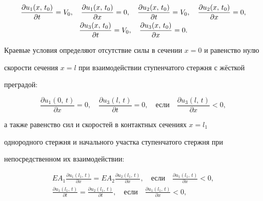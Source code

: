 \begin{gather}

\label{bit10:2}\notag

\frac{\partial u_1 (x,\,t_0)}{\partial t}=V_0,

\quad

\frac{\partial u_1 (x,\,t_0)}{\partial x}=0,

\quad

\frac{\partial u_2 (x,\,t_0 )}{\partial t}=V_0,

\quad

\frac{\partial u_2 (x,\,t_0 )}{\partial x}=0,\\

\frac{\partial u_3 (x,\,t_0 )}{\partial t}=V_0,

\quad

\frac{\partial u_3 (x,\,t_0)}{\partial x}=0.

\end{gather}



Краевые условия определяют отсутствие силы в сечении $x =0$ и равенство нулю

скорости сечения $x = l$ при взаимодействии ступенчатого стержня с жёсткой

преградой:

\begin{equation}

\label{bit10:3}

\frac{\partial u_1 (0,\,t)}{\partial x}=0,

\quad

\frac{\partial u_3 (l,\,t)}{\partial t}=0, \quad \text{если} \quad \frac{\partial u_3

(l,\,t)}{\partial x}<0,

\end{equation}

а также равенство сил и скоростей в контактных сечениях \mbox{$x = l_1$}

однородного стержня и начального участка ступенчатого стержня при

непосредственном их взаимодействии:

\begin{gather}

\label{bit10:4}

EA_1 \frac{\partial u_1 (l_1,\,t)}{\partial x}=EA_2 \frac{\partial u_2 (l_1

,\,t)}{\partial x}, \quad \text{если} \quad \frac{\partial u_1 (l_1,\,t)}{\partial x}<0,\\

\label{bit10:5}

\frac{\partial u_1 (l_1,\,t)}{\partial t}=\frac{\partial u_2 (l_1

,\,t)}{\partial t}, \quad \text{если} \quad \frac{\partial u_1 (l_1,\,t)}{\partial x}<0,

\end{gather}

